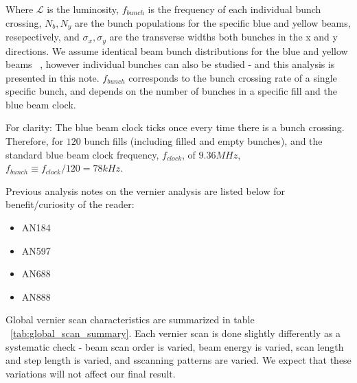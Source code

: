 Where $\mathcal{L}$ is the luminosity, $f_{bunch}$ is the frequency of each individual
bunch crossing, $N_{b}, N_{y}$ are the bunch populations for the specific blue and yellow
beams, resepectively, and $\sigma_{x}, \sigma_{y}$ are the transverse widths both bunches
in the x and y directions. We assume identical beam bunch distributions for the blue and
yellow beams ~\cite{an888}, however individual bunches can also be studied - and this
analysis is presented in this note. $f_{bunch}$ corresponds to the bunch crossing rate of
a single specific bunch, and depends on the number of bunches in a specific fill and the
blue beam clock.

For clarity: The blue beam clock ticks once every time there is a bunch crossing.
Therefore, for $120$ bunch fills (including filled and empty bunches), and the standard
blue beam clock frequency, $f_{clock}$, of $9.36 MHz$, $f_{bunch} \equiv f_{clock} / 120 =
78 kHz$.

Previous analysis notes on the vernier analysis are listed below for benefit/curiosity of
the reader:

\begin{itemize}
\item AN184~\cite{an184}
\item AN597~\cite{an597}
\item AN688~\cite{an688}
\item AN888~\cite{an888}
\end{itemize}

Global vernier scan characteristics are summarized in table
~\ref{tab:global_scan_summary}. Each vernier scan is done slightly differently as a
systematic check - beam scan order is varied, beam energy is varied, scan length and step
length is varied, and sscanning patterns are varied. We expect that these variations will
not affect our final result.




\setcounter{page}{1}

\clearpage

\resetlinenumber

\clearpage

\resetlinenumber

\tableofcontents

\clearpage

\resetlinenumber
